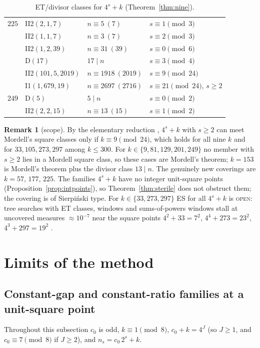 \documentclass[11pt,reqno]{amsart}
\theoremstyle{definition}
\newtheorem{remark}[theorem]{Remark}
\newcommand{\status}[1]{\textup{\textsc{#1}}}
\begin{document}
\begin{table}[ht]
\begin{tabular}{llll}
\midrule
$225$ & II2$(2,1,7)$ & $n\equiv5\ (7)$ & $s\equiv 1\pmod{3}$ \\
 & II2$(1,1,7)$ & $n\equiv3\ (7)$ & $s\equiv 2\pmod{3}$ \\
 & II2$(1,2,39)$ & $n\equiv31\ (39)$ & $s\equiv 0\pmod{6}$ \\
 & D$(17)$ & $17\mid n$ & $s\equiv 3\pmod{4}$ \\
 & II2$(101,5,2019)$ & $n\equiv1918\ (2019)$ & $s\equiv 9\pmod{24}$ \\
 & I1$(1,679,19)$ & $n\equiv2697\ (2716)$ & $s\equiv 21\pmod{24}$, $s\ge2$ \\
\midrule
$249$ & D$(5)$ & $5\mid n$ & $s\equiv 0\pmod{2}$ \\
 & II2$(2,2,15)$ & $n\equiv13\ (15)$ & $s\equiv 1\pmod{2}$ \\
\bottomrule
\end{tabular}
\caption{ET/divisor classes for $4^s+k$ (Theorem~\ref{thm:nine}).}\label{tab:nine}
\end{table}

\begin{remark}[scope]\label{rem:nine}
By the elementary reduction \cite[Lemma~1.1]{SignFields}, $4^s+k$ with
$s\ge2$ can meet Mordell's square classes only if $k\equiv9\pmod{24}$, which
holds for all nine $k$ and for $33,105,273,297$ among $k\le300$.  For
$k\in\{9,81,129,201,249\}$ no member with $s\ge2$ lies in a Mordell square
class, so these cases are Mordell's theorem; $k=153$ is Mordell's theorem
plus the divisor class $13\mid n$.  The genuinely new coverings are
$k=57$, $177$, $225$.  The families $4^s+k$ have no integer unit-square
points (Proposition~\ref{prop:intpoints}), so Theorem~\ref{thm:sterile} does
not obstruct them; the covering is of Sierpi\'nski type.  For
$k\in\{33,273,297\}$ ES for all $4^s+k$ is \status{open}: tree searches with
ET classes, windows and sums-of-powers windows stall at uncovered measures
$\approx10^{-7}$ near the square points $4^2+33=7^2$, $4^4+273=23^2$,
$4^3+297=19^2$ \cite{SignFields,Sparks6,Exp105,ExpOpen}.
\end{remark}

\section{Limits of the method}\label{sec:limits}

\subsection{Constant-gap and constant-ratio families at a unit-square point}
Throughout this subsection $c_0$ is odd, $k\equiv1\pmod8$, $c_0+k=4^J$
\textup{(}so $J\ge1$, and $c_0\equiv7\pmod8$ if $J\ge2$\textup{)}, and
$n_s=c_0\,2^s+k$.
\end{document}
